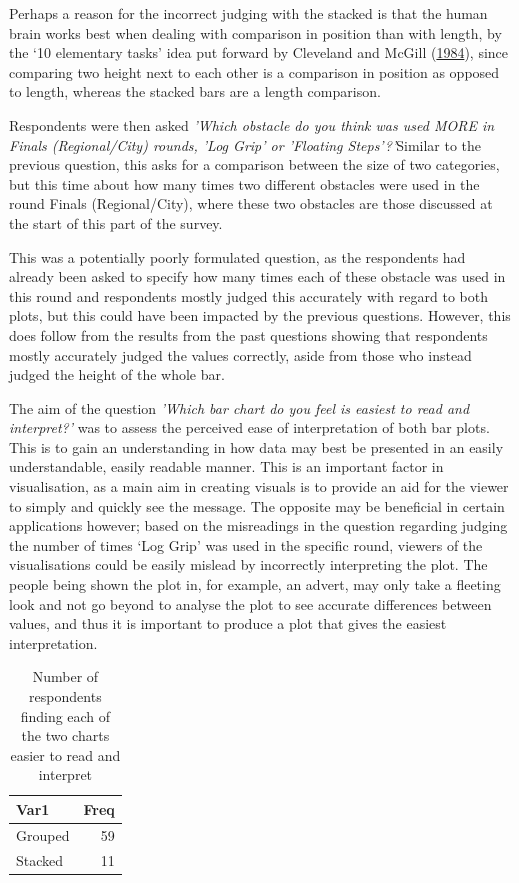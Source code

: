 \documentclass[
  11pt,
]{book}
\begin{document}
Perhaps a reason for the incorrect judging with the stacked is that the
human brain works best when dealing with comparison in position than
with length, by the `10 elementary tasks' idea put forward by Cleveland
and McGill (\protect\hyperlink{ref-clevelandmcgill}{1984}), since
comparing two height next to each other is a comparison in position as
opposed to length, whereas the stacked bars are a length comparison.

Respondents were then asked
\textit{'Which obstacle do you think was used MORE in Finals (Regional/City) rounds, 'Log Grip' or 'Floating Steps'?'}Similar
to the previous question, this asks for a comparison between the size of
two categories, but this time about how many times two different
obstacles were used in the round Finals (Regional/City), where these two
obstacles are those discussed at the start of this part of the survey.

This was a potentially poorly formulated question, as the respondents
had already been asked to specify how many times each of these obstacle
was used in this round and respondents mostly judged this accurately
with regard to both plots, but this could have been impacted by the
previous questions. However, this does follow from the results from the
past questions showing that respondents mostly accurately judged the
values correctly, aside from those who instead judged the height of the
whole bar.

The aim of the question
\textit{'Which bar chart do you feel is easiest to read and interpret?'}
was to assess the perceived ease of interpretation of both bar plots.
This is to gain an understanding in how data may best be presented in an
easily understandable, easily readable manner. This is an important
factor in visualisation, as a main aim in creating visuals is to provide
an aid for the viewer to simply and quickly see the message. The
opposite may be beneficial in certain applications however; based on the
misreadings in the question regarding judging the number of times `Log
Grip' was used in the specific round, viewers of the visualisations
could be easily mislead by incorrectly interpreting the plot. The people
being shown the plot in, for example, an advert, may only take a
fleeting look and not go beyond to analyse the plot to see accurate
differences between values, and thus it is important to produce a plot
that gives the easiest interpretation.

\begin{table}[!h]

\caption{\label{tab:unnamed-chunk-67}Number of respondents finding each of the two charts easier to read and interpret}
\centering
\begin{tabular}[t]{l|r}
\hline
Var1 & Freq\\
\hline
Grouped & 59\\
\hline
Stacked & 11\\
\hline
\end{tabular}
\end{table}
\end{document}
